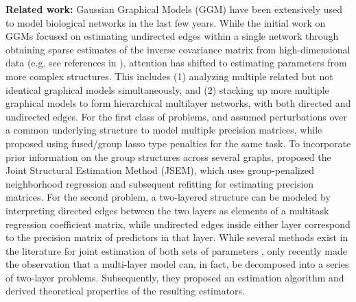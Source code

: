 \noindent
\textbf{Related work:}
Gaussian Graphical Models (GGM) have been extensively used to model biological networks in the last few years. While the initial work on GGMs focused on estimating undirected edges within a single network through obtaining sparse estimates of the inverse covariance matrix from high-dimensional data (e.g. see references in \citet{BuhlmannvandeGeer11}), attention has shifted to estimating parameters from more complex structures. This includes (1) analyzing multiple related but not identical graphical models simultaneously, and (2) stacking up more multiple graphical models to form hierarchical multilayer networks, with both directed and undirected edges. For the first class of problems, \citet{GuoEtal11} and \citet{XieLiuValdar16} assumed perturbations over a common underlying structure to model multiple precision matrices, while \citet{DanaherEtal14} proposed using fused/group lasso type penalties for the same task. To incorporate prior information on the group structures across several graphs, \citet{MaMichailidis15} proposed the Joint Structural Estimation Method (JSEM), which uses group-penalized neighborhood regression and subsequent refitting for estimating precision matrices.
For the second problem, a two-layered structure can be modeled by interpreting directed edges between the two layers as elements of a multitask regression coefficient matrix, while undirected edges inside either layer correspond to the precision matrix of predictors in that layer. While several methods exist in the literature for joint estimation of both sets of parameters \citep{LeeLiu12, CaiEtal12}, only recently \citet{LinEtal16} made the observation that a multi-layer model can, in fact, be decomposed into a series of two-layer problems. Subsequently, they proposed an estimation algorithm and derived theoretical properties of the resulting estimators.

